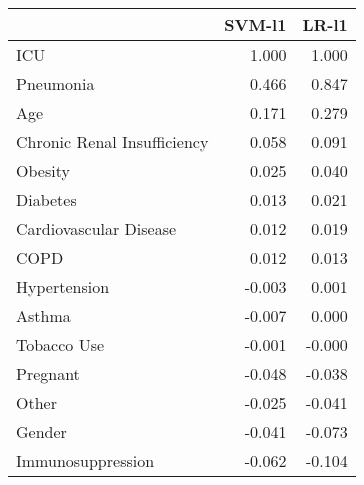 \begin{tabular}{lrr}
\toprule
{} &  SVM-l1 &  LR-l1 \\
\midrule
ICU                         &   1.000 &  1.000 \\
Pneumonia                   &   0.466 &  0.847 \\
Age                         &   0.171 &  0.279 \\
Chronic Renal Insufficiency &   0.058 &  0.091 \\
Obesity                     &   0.025 &  0.040 \\
Diabetes                    &   0.013 &  0.021 \\
Cardiovascular Disease      &   0.012 &  0.019 \\
COPD                        &   0.012 &  0.013 \\
Hypertension                &  -0.003 &  0.001 \\
Asthma                      &  -0.007 &  0.000 \\
Tobacco Use                 &  -0.001 & -0.000 \\
Pregnant                    &  -0.048 & -0.038 \\
Other                       &  -0.025 & -0.041 \\
Gender                      &  -0.041 & -0.073 \\
Immunosuppression           &  -0.062 & -0.104 \\
\bottomrule
\end{tabular}
